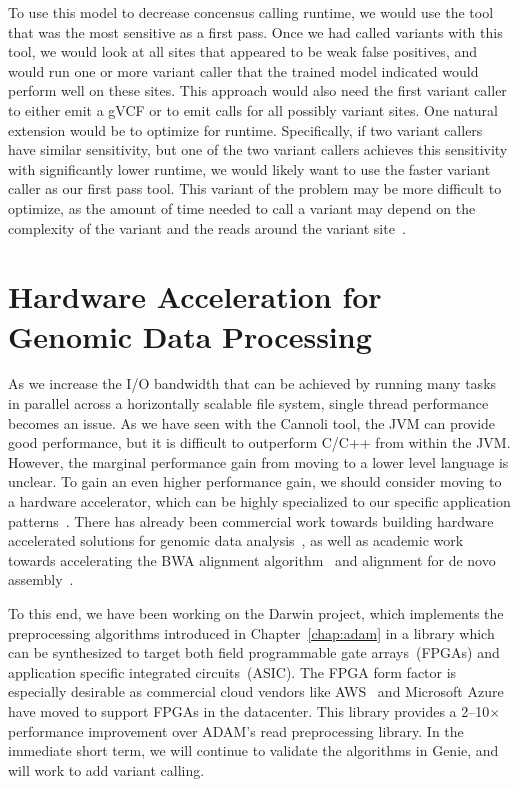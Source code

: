 \documentclass[phd]{ucbthesis}
\begin{document}
To use this model to decrease concensus calling runtime, we would use the tool
that was the most sensitive as a first pass. Once we had called variants with
this tool, we would look at all sites that appeared to be weak false positives,
and would run one or more variant caller that the trained model indicated would
perform well on these sites. This approach would also need the first variant
caller to either emit a gVCF or to emit calls for all possibly variant sites.
One natural extension would be to optimize for runtime. Specifically, if two
variant callers have similar sensitivity, but one of the two variant callers
achieves this sensitivity with significantly lower runtime, we would likely want
to use the faster variant caller as our first pass tool. This variant of the
problem may be more difficult to optimize, as the amount of time needed to
call a variant may depend on the complexity of the variant and the reads around
the variant site~\cite{bloniarz14}.

\section{Hardware Acceleration for Genomic Data Processing}
\label{sec:genomic-hardware}

As we increase the I/O bandwidth that can be achieved by running many tasks in
parallel across a horizontally scalable file system, single thread performance
becomes an issue. As we have seen with the {Cannoli} tool, the JVM can
provide good performance, but it is difficult to outperform C/C++ from within
the JVM. However, the marginal performance gain from moving to a lower level
language is unclear. To gain an even higher performance gain, we should consider
moving to a hardware accelerator, which can be highly specialized to our
specific application patterns~\cite{asanovic17}. There has already been
commercial work towards building hardware accelerated solutions for genomic data
analysis~\cite{dragen}, as well as academic work towards accelerating the
{BWA} alignment algorithm~\cite{chen16, chen15} and alignment for de novo
assembly~\cite{turakhia17}.

To this end, we have been working on the {Darwin} project, which
implements the preprocessing algorithms introduced in Chapter~\ref{chap:adam} in
a library which can be synthesized to target both field programmable gate
arrays~(FPGAs) and application specific integrated circuits~(ASIC). The FPGA
form factor is especially desirable as commercial cloud vendors like
AWS~\cite{f1} and Microsoft Azure~\cite{putnam14} have moved to support FPGAs in
the datacenter. This library provides a 2--10$\times$ performance improvement
over {ADAM}'s read preprocessing library. In the immediate short term, we
will continue to validate the algorithms in {Genie}, and will work to add
variant calling.
\end{document}
